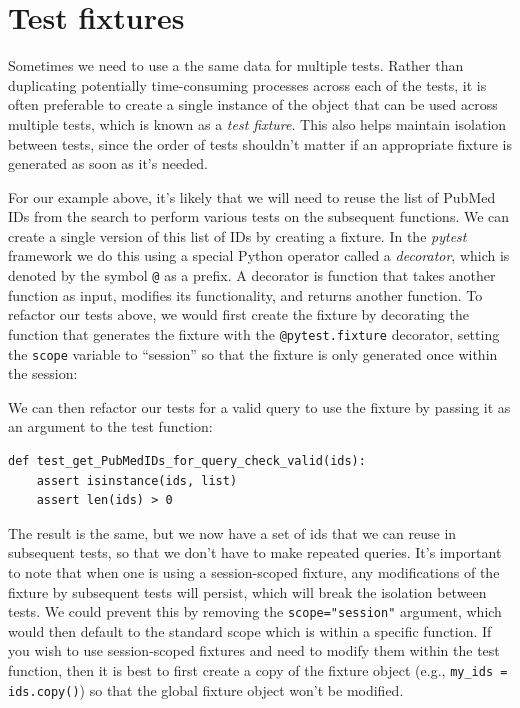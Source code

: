 \section{Test fixtures}

Sometimes we need to use a the same data for multiple tests.
Rather than duplicating potentially time-consuming processes across each of the tests, it is often preferable to create a single instance of the object that can be used across multiple tests, which is known as a \textit{test fixture}.
This also helps maintain isolation between tests, since the order of tests shouldn't matter if an appropriate fixture is generated as soon as it's needed.

For our example above, it's likely that we will need to reuse the list of PubMed IDs from the search to perform various tests on the subsequent functions.
We can create a single version of this list of IDs by creating a fixture.
In the \textit{pytest} framework we do this using a special Python operator called a \textit{decorator}, which is denoted by the symbol \texttt{@} as a prefix.
A decorator is function that takes another function as input, modifies its functionality, and returns another function.
To refactor our tests above, we would first create the fixture by decorating the function that generates the fixture with the \texttt{@pytest.fixture} decorator, setting the \texttt{scope} variable to ``session'' so that the fixture is only generated once within the session:



We can then refactor our tests for a valid query to use the fixture by passing it as an argument to the test function:

\begin{lstlisting}[style=Pythonshort]
def test_get_PubMedIDs_for_query_check_valid(ids):
    assert isinstance(ids, list)
    assert len(ids) > 0
\end{lstlisting}

The result is the same, but we now have a set of ids that we can reuse in subsequent tests, so that we don't have to make repeated queries.
It's important to note that when one is using a session-scoped fixture, any modifications of the fixture by subsequent tests will persist, which will break the isolation between tests.
We could prevent this by removing the \texttt{scope="session"} argument, which would then default to the standard scope which is within a specific function.
If you wish to use session-scoped fixtures and need to modify them within the test function, then it is best to first create a copy of the fixture object (e.g., \texttt{my\_ids = ids.copy()}) so that the global fixture object won't be modified.

